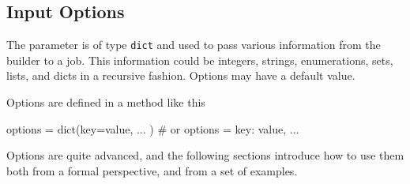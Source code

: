 


\subsection*{Input Options}

The \options parameter is of type \texttt{dict} and used to pass
various information from the builder to a job.  This information could
be integers, strings, enumerations, sets, lists, and dicts in a
recursive fashion.  Options may have a default value.

Options are defined in a method like this
\begin{python}
  options = dict(key=value, ... )  # or
  options = {key: value, ...}
\end{python}

Options are quite advanced, and the following sections introduce how
to use them both from a formal perspective, and from a set of
examples.

